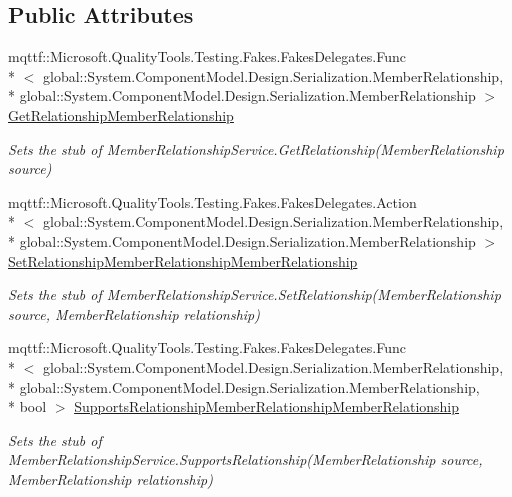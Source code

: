 \subsection*{Public Attributes}
\begin{DoxyCompactItemize}
\item 
mqttf\-::\-Microsoft.\-Quality\-Tools.\-Testing.\-Fakes.\-Fakes\-Delegates.\-Func\\*
$<$ global\-::\-System.\-Component\-Model.\-Design.\-Serialization.\-Member\-Relationship, \\*
global\-::\-System.\-Component\-Model.\-Design.\-Serialization.\-Member\-Relationship $>$ \hyperlink{class_system_1_1_component_model_1_1_design_1_1_serialization_1_1_fakes_1_1_stub_member_relationship_service_a214719d3c42f243889e056466c6bbbce}{Get\-Relationship\-Member\-Relationship}
\begin{DoxyCompactList}\small\item\em Sets the stub of Member\-Relationship\-Service.\-Get\-Relationship(\-Member\-Relationship source)\end{DoxyCompactList}\item 
mqttf\-::\-Microsoft.\-Quality\-Tools.\-Testing.\-Fakes.\-Fakes\-Delegates.\-Action\\*
$<$ global\-::\-System.\-Component\-Model.\-Design.\-Serialization.\-Member\-Relationship, \\*
global\-::\-System.\-Component\-Model.\-Design.\-Serialization.\-Member\-Relationship $>$ \hyperlink{class_system_1_1_component_model_1_1_design_1_1_serialization_1_1_fakes_1_1_stub_member_relationship_service_aae64dfb0d9c783ce701d3e70c1edaa51}{Set\-Relationship\-Member\-Relationship\-Member\-Relationship}
\begin{DoxyCompactList}\small\item\em Sets the stub of Member\-Relationship\-Service.\-Set\-Relationship(\-Member\-Relationship source, Member\-Relationship relationship)\end{DoxyCompactList}\item 
mqttf\-::\-Microsoft.\-Quality\-Tools.\-Testing.\-Fakes.\-Fakes\-Delegates.\-Func\\*
$<$ global\-::\-System.\-Component\-Model.\-Design.\-Serialization.\-Member\-Relationship, \\*
global\-::\-System.\-Component\-Model.\-Design.\-Serialization.\-Member\-Relationship, \\*
bool $>$ \hyperlink{class_system_1_1_component_model_1_1_design_1_1_serialization_1_1_fakes_1_1_stub_member_relationship_service_a355dfa2fcc72bab6f7a6afa9ae6c689a}{Supports\-Relationship\-Member\-Relationship\-Member\-Relationship}
\begin{DoxyCompactList}\small\item\em Sets the stub of Member\-Relationship\-Service.\-Supports\-Relationship(\-Member\-Relationship source, Member\-Relationship relationship)\end{DoxyCompactList}\end{DoxyCompactItemize}
